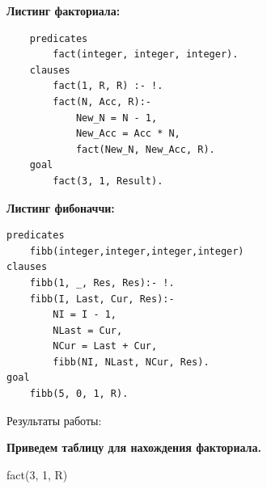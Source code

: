 \documentclass[12pt, a4paper]{extarticle}
\begin{document}
\hfill

\textbf{Листинг факториала:}

\begin{lstlisting}
	predicates
		fact(integer, integer, integer).	
	clauses
		fact(1, R, R) :- !.
		fact(N, Acc, R):-
			New_N = N - 1,
			New_Acc = Acc * N,
			fact(New_N, New_Acc, R).		
	goal
		fact(3, 1, Result). 
\end{lstlisting}
\par

\textbf{Листинг фибоначчи:}
\begin{lstlisting}
predicates
	fibb(integer,integer,integer,integer)
clauses
	fibb(1, _, Res, Res):- !.
	fibb(I, Last, Cur, Res):- 
		NI = I - 1,
		NLast = Cur,
		NCur = Last + Cur,
		fibb(NI, NLast, NCur, Res).
goal
	fibb(5, 0, 1, R).
\end{lstlisting}
\newpage

Результаты работы:\par
\begin{figure}[h!]
	\begin{minipage}[h]{0.48\linewidth}
	\end{minipage}
	\hfill
	\begin{minipage}[h]{0.48\linewidth}
	\end{minipage}
\end{figure}\par

\newpage
\textbf{Приведем таблицу для нахождения факториала. }\par
fact(3, 1, R)\par
\end{document}
